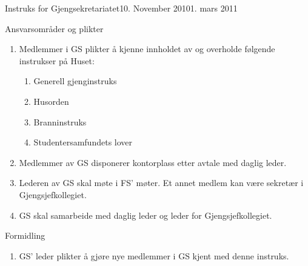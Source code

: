 \documentclass[../fsbok.tex]{subfiles}
\begin{document}
\begin{instruks}{Instruks for Gjengsekretariatet}{10. November 2010}{1. mars 2011}
    \begin{instruksledd}{Ansvarsområder og plikter}
        \begin{enumerate}
            \item Medlemmer i GS plikter å kjenne innholdet av og overholde følgende instrukser på Huset:
                \begin{enumerate}
                    \item Generell gjenginstruks
                    \item Husorden
                    \item Branninstruks
                    \item Studentersamfundets lover
                \end{enumerate}
            \item Medlemmer av GS disponerer kontorplass etter avtale med daglig leder.
            \item Lederen av GS skal møte i FS' møter. Et annet medlem kan være sekretær i
Gjengsjefkollegiet.
            \item GS skal samarbeide med daglig leder og leder for Gjengsjefkollegiet.
        \end{enumerate}
    \end{instruksledd}

    \begin{instruksledd}{Formidling}
        \begin{enumerate}
            \item GS' leder plikter å gjøre nye medlemmer i GS kjent med denne instruks.
        \end{enumerate}
    \end{instruksledd}


\end{instruks}
\end{document}
